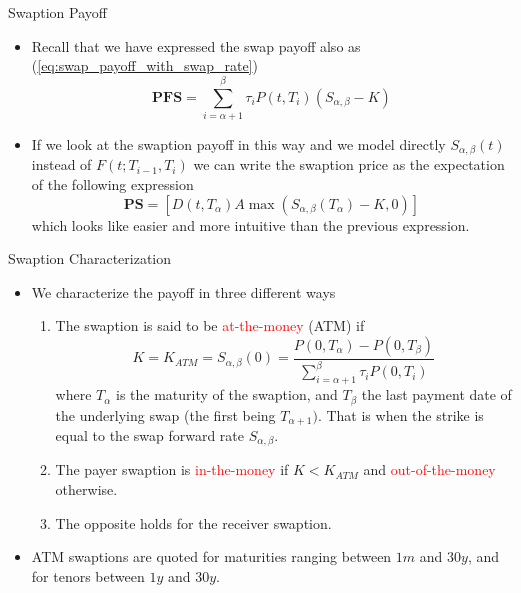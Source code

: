 \documentclass{beamer}
\begin{document}
\begin{frame}{Swaption Payoff}
\begin{itemize}
	\item<1-> Recall that we have expressed the swap payoff also as (\cref{eq:swap_payoff_with_swap_rate})
	\begin{equation*}
	\textbf{PFS}=\sum_{i=\alpha+1}^\beta \tau_i P(t,T_i)(S_{\alpha,\beta}-K)
	\end{equation*}
	\item<2-> If we look at the swaption payoff in this way and we model directly $S_{\alpha,\beta}(t)$ instead of $F(t;T_{i-1},T_i)$ we can write the swaption price as the expectation of the following expression
	\begin{equation}
		\textbf{PS}=\left[D(t,T_\alpha)A\max(S_{\alpha,\beta}(T_\alpha)-K, 0)\right]
	\end{equation}
	which looks like easier and more intuitive than the previous expression.
\end{itemize}
\end{frame}

\begin{frame}{Swaption Characterization}
	\begin{itemize}	
		\item We characterize the payoff in three different ways
		\begin{enumerate}
			\item The swaption is said to be \textcolor{red}{at-the-money} (ATM) if
			\begin{equation*}
				K = K_{ATM} = S_{\alpha,\beta}(0) = \frac{P(0,T_\alpha)-P(0,T_\beta)}{\sum_{i=\alpha+1}^\beta \tau_i P(0,T_i)}
			\end{equation*}
			where $T_\alpha$ is the maturity of the swaption, and $T_\beta$ the last payment date of the underlying swap (the first being $T_{\alpha+1})$. That is when the strike is equal to the swap forward rate $S_{\alpha,\beta}$.
			\item The payer swaption is \textcolor{red}{in-the-money} if $K<K_{ATM}$ and \textcolor{red}{out-of-the-money} otherwise.
			\item The opposite holds for the receiver swaption.
		\end{enumerate}
		\item ATM swaptions are quoted for maturities ranging between $1m$ and $30y$, and for tenors between $1y$ and $30y$.
	\end{itemize}
\end{frame}
\end{document}
